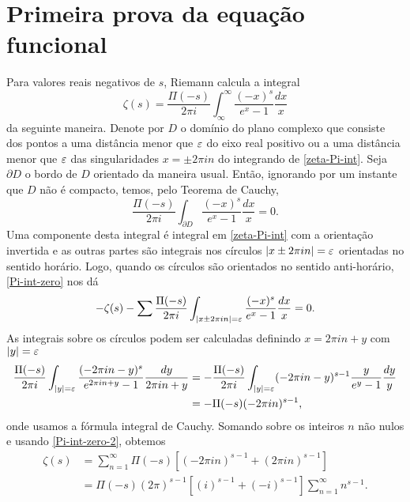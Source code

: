     
    \section*{Primeira prova da equação funcional}
    
    
    Para valores reais negativos de $s$, Riemann calcula a integral
    \begin{equation}
        \label{zeta-Pi-int}
        \zeta(s) = \frac{\Pi(-s)}{2\pi i} \int_{\infty}^{\infty} \frac{(-x)^s}{e^x - 1} \frac{dx}{x}
    \end{equation}
    da seguinte maneira. Denote por $D$ o domínio do plano complexo que consiste dos pontos a uma distância menor que $\varepsilon$ do eixo real positivo ou a uma distância menor que $\varepsilon$ das singularidades $x = \pm 2 \pi i n$ do integrando de \eqref{zeta-Pi-int}. Seja $\partial D$ o bordo de $D$ orientado da maneira usual. Então, ignorando por um instante que $D$ não é compacto, temos, pelo Teorema de Cauchy, 
    \begin{equation}
        \label{Pi-int-zero}
        \frac{\Pi(-s)}{2\pi i} \int_{\partial D} \frac{(-x)^s}{e^x - 1} \frac{dx}{x} = 0.
    \end{equation}
    Uma componente desta integral é integral em \eqref{zeta-Pi-int} com a orientação invertida e as outras partes são integrais nos círculos $|x \pm 2\pi i n| = \varepsilon$ orientadas no sentido horário. Logo, quando os círculos são orientados no sentido anti-horário, \eqref{Pi-int-zero} nos dá
    \begin{equation}
        \label{Pi-int-zero-2}
        -\zeta(s) - \sum \frac{\Pi(-s)}{2\pi i} \int_{|x \pm 2\pi i n| = \varepsilon} \frac{(-x)^s}{e^x - 1} \frac{dx}{x} = 0.
    \end{equation}
    As integrais sobre os círculos podem ser calculadas definindo $x = 2\pi i n + y$ com $|y| = \varepsilon$
    \begin{align*}
        \frac{\Pi(-s)}{2\pi i} \int_{|y| = \varepsilon} \frac{(-2 \pi i n - y)^s}{e^{2 \pi i n + y} - 1} \frac{dy}{2\pi i n + y} 
        &=
        -\frac{\Pi(-s)}{2\pi i} \int_{|y| = \varepsilon} (-2 \pi i n - y)^{s-1} \frac{y}{e^y - 1} \frac{dy}{y} \\
        &= - \Pi(-s)(-2\pi i n)^{s-1},
    \end{align*}
    onde usamos a fórmula integral de Cauchy. Somando sobre os inteiros $n$ não nulos e usando \eqref{Pi-int-zero-2}, obtemos
    \begin{align*}
        \zeta(s) &= \sum_{n=1}^{\infty} \Pi(-s)[(-2\pi i n)^{s-1} + (2\pi i n)^{s-1}] \\
        &= \Pi(-s)(2\pi)^{s-1}[(i)^{s-1} + (-i)^{s-1}] \sum_{n=1}^{\infty} n^{s-1}.
    \end{align*}
